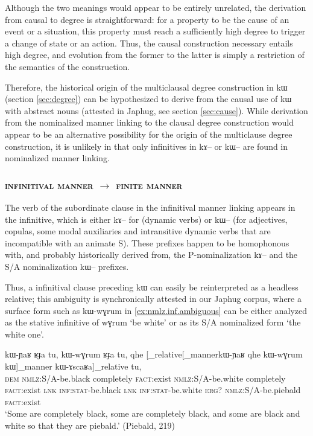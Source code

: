 \documentclass[oldfontcommands,oneside,a4paper,11pt]{article}
\newcommand{\ipa}[1]{{\phon #1}} %
\begin{document}
Although the two meanings would appear to be entirely unrelated, the derivation from causal to degree is straightforward: for a property to be the cause of an event or a situation, this property must reach a sufficiently high degree to trigger a change of state or an action. Thus,  the causal construction necessary entails high degree, and evolution from the former to the latter is simply a restriction of the semantics of the construction.

Therefore, the historical origin of the multiclausal   degree construction in \ipa{kɯ}   (section \ref{sec:degree})   can be hypothesized to derive  from  the causal use of \ipa{kɯ}   with abstract nouns (attested in Japhug, see section \ref{sec:cause}). While derivation from the nominalized manner linking to the clausal degree construction would appear to be an alternative possibility for the origin of the multiclause degree construction, it is unlikely in that only infinitives in \ipa{kɤ--} or \ipa{kɯ--} are found in nominalized manner linking.  

 
  \subsubsection{\textsc{infinitival manner} $\rightarrow$ \textsc{finite manner}}

The verb of the subordinate clause in the infinitival manner linking appears in the infinitive, which is either \ipa{kɤ--} for (dynamic verbs) or \ipa{kɯ--} (for adjectives, copulas, some modal auxiliaries and intransitive dynamic verbs that are incompatible with an animate S). These prefixes happen to be homophonous with, and probably historically derived from, the P-nominalization \ipa{kɤ--} and the S/A nominalization \ipa{kɯ--} prefixes.

Thus, a infinitival clause preceding \ipa{kɯ} can easily be reinterpreted as a headless relative; this ambiguity is synchronically attested in our Japhug corpus, where a surface form such as \ipa{kɯ-wɣrum} in \ref{ex:nmlz.inf.ambiguous} can be either analyzed as the stative infinitive of \ipa{wɣrum} `be white' or as its S/A nominalized form `the white one'.
 
 \begin{exe}
\ex \label{ex:nmlz.inf.ambiguous}
\gll \ipa{nɯnɯ}  	\ipa{kɯ-ɲaʁ}  	\ipa{ʁɟa}  	\ipa{tu,}  	\ipa{kɯ-wɣrum}  	\ipa{ʁɟa}  	\ipa{tu,}   \ipa{qhe}  	[_{relative}[_{manner}\ipa{kɯ-ɲaʁ}  	\ipa{qhe}  	\ipa{kɯ-wɣrum}  	\ipa{kɯ}]_{manner}   	\ipa{kɯ-ɤscaʁa}]_{relative}  	\ipa{tu,}  \\
\textsc{dem} \textsc{nmlz}:S/A-be.black completely \textsc{fact}:exist
\textsc{nmlz}:S/A-be.white completely \textsc{fact}:exist
\textsc{lnk}   \textsc{inf:stat}-be.black \textsc{lnk} \textsc{inf:stat}-be.white \textsc{erg?} \textsc{nmlz}:S/A-be.piebald  \textsc{fact}:exist \\
\glt `Some are completely black, some are completely black, and some are black and white so that they are piebald.' (Piebald,  219)
\end{exe}
\end{document}

